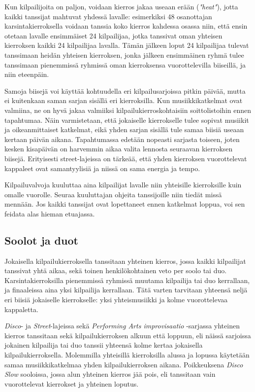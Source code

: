 \documentclass[12pt, a4paper, oneside]{article}
\begin{document}
Kun kilpailijoita on paljon,
voidaan kierros jakaa useaan erään (\textit{"heat"}),
jotta kaikki tanssijat mahtuvat yhdessä lavalle: esimerkiksi 48 osanottajan karsintakierroksella voidaan tanssia koko kierros kahdessa osassa niin,
että ensin otetaan lavalle ensimmäiset 24 kilpailijaa,
jotka tanssivat oman yhteisen kierroksen kaikki 24 kilpailijaa lavalla.
Tämän jälkeen loput 24 kilpailijaa tulevat tanssimaan heidän yhteisen kierroksen,
jonka jälkeen ensimmäinen ryhmä tulee tanssimaan pienemmissä ryhmissä oman kierroksensa vuorottelevilla biiseillä,
ja niin eteenpäin.

Samoja biisejä voi käyttää kohtuudella eri kilpailusarjoissa pitkin päivää,
mutta ei kuitenkaan saman sarjan sisällä eri kierroksilla.
Kun musiikkikatkelmat ovat valmiina,
ne on hyvä jakaa valmiiksi kilpailukierroskohtaisiin soittolistoihin ennen tapahtumaa.
Näin varmistetaan,
että jokaiselle kierrokselle tulee sopivat musiikit ja oikeanmittaiset katkelmat,
eikä yhden sarjan sisällä tule samaa biisiä useaan kertaan päivän aikana.
Tapahtumassa edetään nopeasti sarjasta toiseen,
joten kesken kisapäivän on harvemmin aikaa valita lennosta seuraavan kierroksen biisejä.
Erityisesti street-lajeissa on tärkeää,
että yhden kierroksen vuorottelevat kappaleet ovat samantyylisiä ja niissä on sama energia ja tempo.

Kilpailuvalvoja kuuluttaa aina kilpailijat lavalle niin yhteisille kierroksille kuin omalle vuorolle.
Seuraa kuuluttajan ohjeita tanssijoille niin tiedät missä mennään.
Jos kaikki tanssijat ovat lopettaneet ennen katkelmat loppua,
voi sen feidata alas hieman etuajassa.

\subsection{Soolot ja duot} \label{subsec:soolot-ja-duot}

Jokaisella kilpailukierroksella tanssitaan yhteinen kierros,
jossa kaikki kilpailijat tanssivat yhtä aikaa,
sekä toinen henkilökohtainen veto per soolo tai duo.
Karsintakierroksilla pienemmissä ryhmissä muutama kilpailija tai duo kerrallaan,
ja finaaleissa aina yksi kilpailija kerrallaan.
Tätä varten tarvitaan yhteensä neljä eri biisiä jokaiselle kierrokselle:
yksi yhteismusiikki ja kolme vuorottelevaa kappaletta.

\textit{Disco}- ja \textit{Street}-lajeissa sekä \textit{Performing Arts improvisaatio} -sarjassa yhteinen kierros tanssitaan sekä kilpailukierroksen alkuun että loppuun,
eli näissä sarjoissa jokainen kilpailija tai duo tanssii yhteensä kolme kertaa jokaisella kilpailukierroksella.
Molemmilla yhteisillä kierroksilla alussa ja lopussa käytetään samaa musiikkikatkelmaa yhden kilpailukierroksen aikana.
Poikkeuksena \textit{Disco Slow} sooloissa,
jossa alun yhteinen kierros jää pois,
eli tanssitaan vain vuorottelevat kierrokset ja yhteinen loputus.
\end{document}
